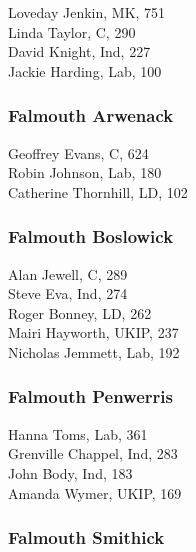 \documentclass[a4paper,openany,10pt]{book}
\begin{document}


Loveday Jenkin, MK, 751\\
Linda Taylor, C, 290\\
David Knight, Ind, 227\\
Jackie Harding, Lab, 100\\


\subsubsection*{Falmouth Arwenack}



Geoffrey Evans, C, 624\\
Robin Johnson, Lab, 180\\
Catherine Thornhill, LD, 102\\


\subsubsection*{Falmouth Boslowick}



Alan Jewell, C, 289\\
Steve Eva, Ind, 274\\
Roger Bonney, LD, 262\\
Mairi Hayworth, UKIP, 237\\
Nicholas Jemmett, Lab, 192\\


\subsubsection*{Falmouth Penwerris}



Hanna Toms, Lab, 361\\
Grenville Chappel, Ind, 283\\
John Body, Ind, 183\\
Amanda Wymer, UKIP, 169\\


\subsubsection*{Falmouth Smithick}
\end{document}

